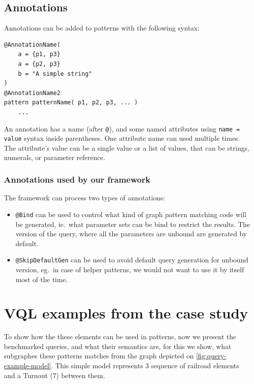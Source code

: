 \subsection{Annotations}

\begin{minipage}{\textwidth}
Annotations can be added to patterns with the following syntax:
\begin{lstlisting}[language=vql]
@AnnotationName(
	a = {p1, p3}
	a = {p2, p3}
	b = "A simple string"
)
@AnnotationName2
pattern patternName( p1, p2, p3, ... )
	...
\end{lstlisting}
\end{minipage}
\vspace{\belowdisplayskip}

An annotation has a name (after \texttt{@}), and some named attributes using \texttt{name = value} syntax inside parentheses.
One attribute name can used multiple times. 
The attribute's value can be a single value or a list of values, that can be strings, numerals, or parameter reference.


\subsubsection{Annotations used by our framework}

The framework can process two types of annotations:
\begin{itemize}
	\item \texttt{@Bind} can be used to control what kind of graph pattern matching code will be generated, ie.\ what parameter sets can be bind to restrict the results. The version of the query, where all the parameters are unbound are generated by default.
	
	\item \texttt{@SkipDefaultGen} can be used to avoid default query generation for unbound version, eg.\ in case of helper patterns, we would not want to use it by itself most of the time.
	
\end{itemize}


\section{VQL examples from the case study}
\label{sec:vql-examples}

To show how the these elements can be used in patterns, now we present the benchmarked queries, and what their semantics are, for this we show, what subgraphes these patterns matches from the graph depicted on \autoref{fig:query-example-model}. This simple model represents 3 sequence of railroad elements and a Turnout (7) between them.
\vspace{0.1\textwidth}


